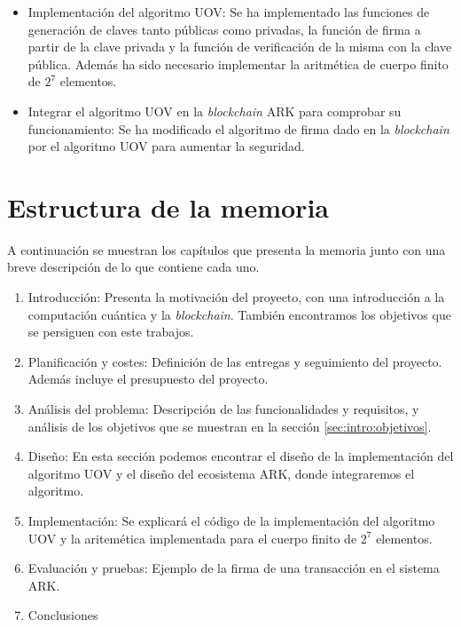 \begin{itemize}
	\item Implementación del algoritmo UOV: Se ha implementado las funciones de generación de claves tanto públicas como privadas, la función de firma a partir de la clave privada y la función de verificación de la misma con la clave pública. Además ha sido necesario implementar la aritmética de cuerpo finito de $2^7$ elementos.
	\item Integrar el algoritmo UOV en la \textit{blockchain} ARK para comprobar su funcionamiento: Se ha modificado el algoritmo de firma dado en la \textit{blockchain} por el algoritmo UOV para aumentar la seguridad.

\end{itemize}


\section{Estructura de la memoria}

A continuación se muestran los capítulos que presenta la memoria junto con una breve descripción de lo que contiene cada uno.

\begin{enumerate}
	\item Introducción: Presenta la motivación del proyecto, con una introducción a la computación cuántica y la \textit{blockchain}. También encontramos los objetivos que se persiguen con este trabajos.
	\item Planificación y costes: Definición de las entregas y seguimiento del proyecto. Además incluye el presupuesto del proyecto.
	\item Análisis del problema: Descripción de las funcionalidades y requisitos, y análisis de los objetivos que se muestran en la sección \ref{sec:intro:objetivos}.
	\item Diseño: En esta sección podemos encontrar el diseño de la implementación del algoritmo UOV y el diseño del ecosistema ARK, donde integraremos el algoritmo.
	\item Implementación: Se explicará el código de la implementación del algoritmo UOV y la aritemética implementada para el cuerpo finito de $2^7$ elementos.
	\item Evaluación y pruebas: Ejemplo de la firma de una transacción en el sistema ARK.
	\item Conclusiones
\end{enumerate}

